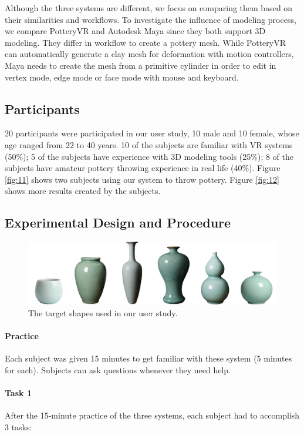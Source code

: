 Although the three systems are different, we focus on comparing them based on their similarities and workflows.
To investigate the influence of modeling process, we compare PotteryVR and Autodesk Maya since they both support 3D modeling. They differ in workflow to create a pottery mesh. While PotteryVR can automatically generate a clay mesh for deformation with motion controllers, Maya needs to create the mesh from a primitive cylinder in order to edit in vertex mode, edge mode or face mode with mouse and keyboard. 

\subsection{Participants}
\label{sec:6.2}
20 participants were participated in our user study, 10 male and 10 female, whose age ranged from 22 to 40 years. 10 of the subjects are familiar with VR systems (50\%); 5 of the subjects have experience with 3D modeling tools (25\%); 8 of the subjects have amateur pottery throwing experience in real life (40\%).
Figure \ref{fig:11} shows two subjects using our system to throw pottery. Figure \ref{fig:12} shows more results created by the subjects.

\subsection{Experimental Design and Procedure}
\label{sec:6.3}

\begin{figure}
\includegraphics[width=\textwidth]{targets.png}
\caption{The target shapes used in our user study.}
\label{fig:7}
\end{figure}

\paragraph{Practice} Each subject was given 15 minutes to get familiar with these system (5 minutes for each). Subjects can ask questions whenever they need help.

\paragraph{Task 1} After the 15-minute practice of the three systems, each subject had to accomplish 3 tasks:

